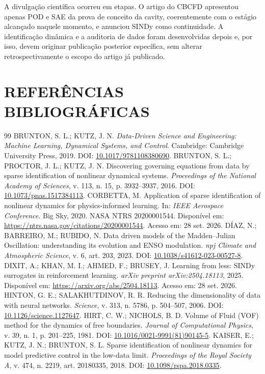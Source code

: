 \documentclass[12pt,a4paper]{article}
\newcommand{\novasecao}[1]{\clearpage\section{#1}}
\begin{document}
A divulgação científica ocorreu em etapas. O artigo do CBCFD apresentou apenas POD e SAE da prova de conceito da cavity, coerentemente com o estágio alcançado naquele momento, e anunciou SINDy como continuidade. A identificação dinâmica e a auditoria de dados foram desenvolvidas depois e, por isso, devem originar publicação posterior específica, sem alterar retrospectivamente o escopo do artigo já publicado.

\novasecao{REFERÊNCIAS BIBLIOGRÁFICAS}
\begin{thebibliography}{99}\small\setlength{\itemsep}{0.25em}
 BRUNTON, S. L.; KUTZ, J. N. \textit{Data-Driven Science and Engineering: Machine Learning, Dynamical Systems, and Control}. Cambridge: Cambridge University Press, 2019. DOI: \href{https://doi.org/10.1017/9781108380690}{10.1017/9781108380690}.
 BRUNTON, S. L.; PROCTOR, J. L.; KUTZ, J. N. Discovering governing equations from data by sparse identification of nonlinear dynamical systems. \textit{Proceedings of the National Academy of Sciences}, v. 113, n. 15, p. 3932--3937, 2016. DOI: \href{https://doi.org/10.1073/pnas.1517384113}{10.1073/pnas.1517384113}.
 CORBETTA, M. Application of sparse identification of nonlinear dynamics for physics-informed learning. In: \textit{IEEE Aerospace Conference}. Big Sky, 2020. NASA NTRS 20200001544. Disponível em: \url{https://ntrs.nasa.gov/citations/20200001544}. Acesso em: 28 set. 2026.
 DÍAZ, N.; BARREIRO, M.; RUBIDO, N. Data driven models of the Madden--Julian Oscillation: understanding its evolution and ENSO modulation. \textit{npj Climate and Atmospheric Science}, v. 6, art. 203, 2023. DOI: \href{https://doi.org/10.1038/s41612-023-00527-8}{10.1038/s41612-023-00527-8}.
 DIXIT, A.; KHAN, M. I.; AHMED, F.; BRUSEY, J. Learning from less: SINDy surrogates in reinforcement learning. \textit{arXiv preprint arXiv:2504.18113}, 2025. Disponível em: \url{https://arxiv.org/abs/2504.18113}. Acesso em: 28 set. 2026.
 HINTON, G. E.; SALAKHUTDINOV, R. R. Reducing the dimensionality of data with neural networks. \textit{Science}, v. 313, n. 5786, p. 504--507, 2006. DOI: \href{https://doi.org/10.1126/science.1127647}{10.1126/science.1127647}.
 HIRT, C. W.; NICHOLS, B. D. Volume of Fluid (VOF) method for the dynamics of free boundaries. \textit{Journal of Computational Physics}, v. 39, n. 1, p. 201--225, 1981. DOI: \href{https://doi.org/10.1016/0021-9991(81)90145-5}{10.1016/0021-9991(81)90145-5}.
 KAISER, E.; KUTZ, J. N.; BRUNTON, S. L. Sparse identification of nonlinear dynamics for model predictive control in the low-data limit. \textit{Proceedings of the Royal Society A}, v. 474, n. 2219, art. 20180335, 2018. DOI: \href{https://doi.org/10.1098/rspa.2018.0335}{10.1098/rspa.2018.0335}.

\end{thebibliography}
\end{document}
